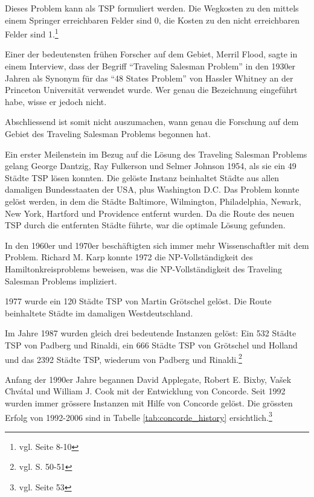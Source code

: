 \documentclass[11pt,a4paper]{article}
\begin{document}
Dieses Problem kann als TSP formuliert werden. Die Wegkosten zu den mittels einem Springer erreichbaren Felder sind 0, die Kosten zu den nicht erreichbaren Felder sind 1.\footnote{vgl. \cite{applegate06} Seite 8-10}

\medskip

Einer der bedeutensten frühen Forscher auf dem Gebiet, Merril Flood, sagte in einem Interview, dass der Begriff "`Traveling Salesman Problem"' in den 1930er Jahren als Synonym für das "`48 States Problem"' von Hassler Whitney an der Princeton Universität verwendet wurde. Wer genau die Bezeichnung eingeführt habe, wisse er jedoch nicht.\cite{interview_merrill_flood84}

Abschliessend ist somit nicht auszumachen, wann genau die Forschung auf dem Gebiet des Traveling Salesman Problems begonnen hat.

\medskip

Ein erster Meilenstein im Bezug auf die Lösung des Traveling Salesman Problems gelang George Dantzig, Ray Fulkerson und Selmer Johnson 1954, als sie ein 49 Städte TSP lösen konnten. Die gelöste Instanz beinhaltet Städte aus allen damaligen Bundesstaaten der USA, plus Washington D.C. Das Problem konnte gelöst werden, in dem die Städte Baltimore, Wilmington, Philadelphia, Newark, New York, Hartford und Providence entfernt wurden. Da die Route des neuen TSP durch die entfernten Städte führte, war die optimale Lösung gefunden.

In den 1960er und 1970er beschäftigten sich immer mehr Wissenschaftler mit dem Problem. Richard M. Karp konnte 1972 die NP-Vollständigkeit des Hamiltonkreisproblems beweisen, was die NP-Vollständigkeit des Traveling Salesman Problems impliziert.

1977 wurde ein 120 Städte TSP von Martin Grötschel gelöst. Die Route beinhaltete Städte im damaligen Westdeutschland.

Im Jahre 1987 wurden gleich drei bedeutende Instanzen gelöst: Ein 532 Städte TSP von Padberg und Rinaldi, ein 666 Städte TSP von Grötschel und Holland und das 2392 Städte TSP, wiederum von Padberg und Rinaldi.\footnote{vgl. \cite{applegate06} S. 50-51}

Anfang der 1990er Jahre begannen David Applegate, Robert E. Bixby, Vašek Chvátal und William J. Cook mit der Entwicklung von Concorde. Seit 1992 wurden immer grössere Instanzen mit Hilfe von Concorde gelöst. Die grössten Erfolg von 1992-2006 sind in Tabelle \ref{tab:concorde_history} ersichtlich.\footnote{vgl. \cite{applegate06} Seite 53}
\end{document}
